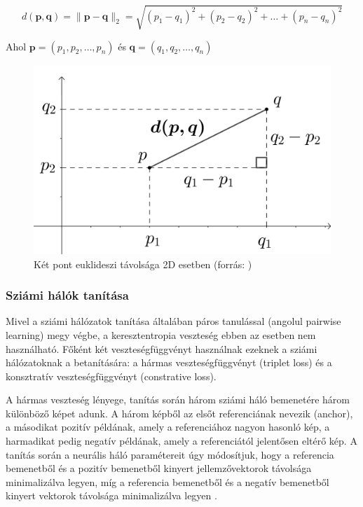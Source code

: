 
\[ d(\mathbf{p},\mathbf{q}) = \lVert \mathbf{p} - \mathbf{q} \rVert_2 = \sqrt{(p_1 - q_1)^2 + (p_2 - q_2)^2 + \dots + (p_n - q_n)^2}\]

Ahol $\mathbf{p} = (p_1, p_2, \dots, p_n)$ és $\mathbf{q} = (q_1, q_2, \dots, q_n)$ 

\begin{figure}[ht]
	\centering
	\includegraphics[width=0.65\columnwidth]{figures/euclidean_distance_2d.png}
	\caption{Két pont euklideszi távolsága 2D esetben (forrás: \cite{euclidean})}
	\label{fig:eukl}
\end{figure}

\subsubsection{Sziámi hálók tanítása}

Mivel a sziámi hálózatok tanítása általában páros tanulással (angolul pairwise learning) megy végbe, a keresztentropia veszteség ebben az esetben nem használható. Főként két veszteségfüggvényt használnak ezeknek a sziámi hálózatoknak a betanítására: a hármas veszteségfüggvényt (triplet loss) és a konsztratív veszteségfüggvényt (constrative loss).

A hármas veszteség lényege, tanítás során három sziámi háló bemenetére három különböző képet adunk. A három képből az elsőt referenciának nevezik (anchor), a másodikat pozitív példának, amely a referenciához nagyon hasonló kép, a harmadikat pedig negatív példának, amely a referenciától jelentősen eltérő kép. A tanítás során a neurális háló paramétereit úgy módosítjuk, hogy a referencia bemenetből és a pozitív bemenetből kinyert jellemzővektorok távolsága minimalizálva legyen, míg a referencia bemenetből és a negatív bemenetből kinyert vektorok távolsága minimalizálva legyen \cite{hoffer2015triplet}.

